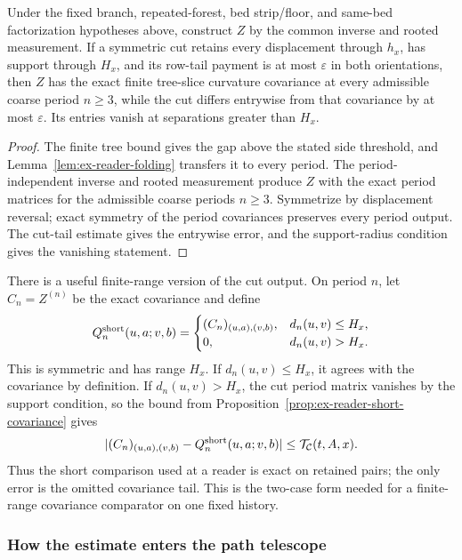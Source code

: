 \begin{proposition}
\label{prop:ex-reader-short-covariance}
Under the fixed branch, repeated-forest, bed strip/floor, and same-bed
factorization hypotheses above, construct $Z$ by the common inverse and
rooted measurement. If a symmetric cut retains every displacement through
$h_x$, has support through $H_x$, and its row-tail payment is at most
$\varepsilon$ in both orientations, then $Z$ has the exact finite
tree-slice curvature covariance at every admissible coarse period $n\ge3$,
while the cut differs entrywise from that covariance by at most
$\varepsilon$. Its entries vanish at separations greater than $H_x$.
\end{proposition}
\begin{proof}
The finite tree bound gives the gap above the stated side threshold, and
Lemma~\ref{lem:ex-reader-folding} transfers it to every period. The
period-independent inverse and rooted measurement produce $Z$ with the
exact period matrices for the admissible coarse periods $n\ge3$.
Symmetrize by displacement reversal; exact symmetry of the period
covariances preserves every period output. The cut-tail
estimate gives the entrywise error, and the support-radius condition gives
the vanishing statement.
\end{proof}

There is a useful finite-range version of the cut output. On period $n$,
let $C_n=Z^{(n)}$ be the exact covariance and define
\[
 Q^{\rm short}_{n}(u,a;v,b)=
 \begin{cases}
 (C_n)_{(u,a),(v,b)},&d_n(u,v)\le H_x,\\
 0,&d_n(u,v)>H_x.
 \end{cases}
\]
This is symmetric and has range $H_x$. If $d_n(u,v)\le H_x$, it agrees
with the covariance by definition. If $d_n(u,v)>H_x$, the cut period
matrix vanishes by the support condition, so the bound from
Proposition~\ref{prop:ex-reader-short-covariance} gives
\[
 |(C_n)_{(u,a),(v,b)}-Q^{\rm short}_{n}(u,a;v,b)|
 \le \mathcal T_{\mathcal C}(t,A,x).
\]
Thus the short comparison used at a reader is exact on retained pairs;
the only error is the omitted covariance tail. This is the two-case form
needed for a finite-range covariance comparator on one fixed history.

\subsubsection{How the estimate enters the path telescope}

